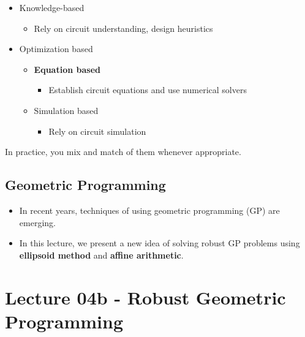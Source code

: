 \documentclass[
]{article}
\providecommand{\tightlist}{%
  \setlength{\itemsep}{0pt}\setlength{\parskip}{0pt}}
\begin{document}
\begin{itemize}
\tightlist
\item
  Knowledge-based

  \begin{itemize}
  \tightlist
  \item
    Rely on circuit understanding, design heuristics
  \end{itemize}
\item
  Optimization based

  \begin{itemize}
  \tightlist
  \item
    \textbf{Equation based}

    \begin{itemize}
    \tightlist
    \item
      Establish circuit equations and use numerical solvers
    \end{itemize}
  \item
    Simulation based

    \begin{itemize}
    \tightlist
    \item
      Rely on circuit simulation
    \end{itemize}
  \end{itemize}
\end{itemize}

In practice, you mix and match of them whenever appropriate.

\hypertarget{geometric-programming}{%
\subsection{Geometric Programming}\label{geometric-programming}}

\begin{itemize}
\tightlist
\item
  In recent years, techniques of using geometric programming (GP) are emerging.
\item
  In this lecture, we present a new idea of solving robust GP problems using \textbf{ellipsoid method} and \textbf{affine arithmetic}.
\end{itemize}

\hypertarget{lecture-04b---robust-geometric-programming}{%
\section{Lecture 04b - Robust Geometric Programming}\label{lecture-04b---robust-geometric-programming}}
\end{document}
